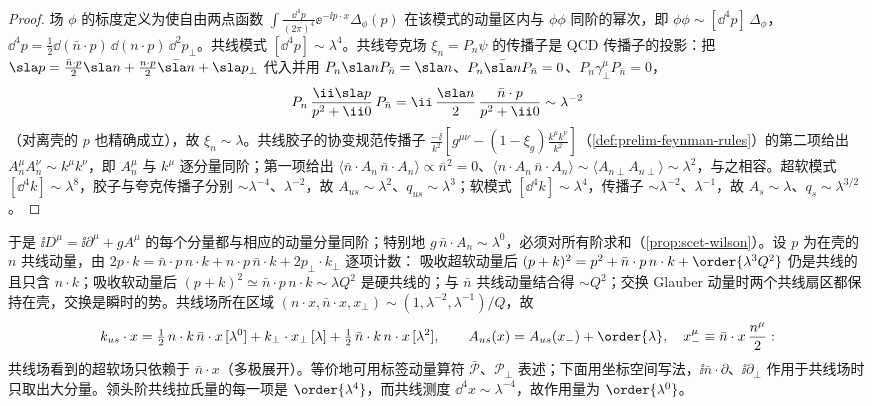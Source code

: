 \begin{proof}
场 $\phi$ 的标度定义为使自由两点函数 $\int\frac{\dd^4p}{(2\pi)^4}\ee^{-\ii p\cdot x}\Delta_\phi(p)$ 在该模式的动量区内与 $\phi\phi$ 同阶的幂次，即 $\phi\phi\sim[\dd^4p]\,\Delta_\phi$，$\dd^4p=\frac12\dd(\bar n\cdot p)\,\dd(n\cdot p)\,\dd^2p_\perp$。共线模式 $[\dd^4p]\sim\lambda^4$。共线夸克场 $\xi_n=P_n\psi$ 的传播子是 QCD 传播子的投影：把 $\sla p=\frac{\bar n\cdot p}{2}\sla n+\frac{n\cdot p}{2}\bar{\sla n}+\sla p_\perp$ 代入并用 $P_n\sla nP_{\bar n}=\sla n$、$P_n\bar{\sla n}P_{\bar n}=0$、$P_n\gamma_\perp^\mu P_{\bar n}=0$，
\begin{equation}\label{eq:scet-xiprop}
P_n\,\frac{\ii\sla p}{p^2+\ii0}\,P_{\bar n}=\ii\,\frac{\sla n}{2}\,\frac{\bar n\cdot p}{p^2+\ii0}\sim\lambda^{-2}
\end{equation}
（对离壳的 $p$ 也精确成立），故 $\xi_n\sim\lambda$。共线胶子的协变规范传播子 $\frac{-\ii}{k^2}[g^{\mu\nu}-(1-\xi_g)\frac{k^\mu k^\nu}{k^2}]$（\cref{def:prelim-feynman-rules}）的第二项给出 $A_n^\mu A_n^\nu\sim k^\mu k^\nu$，即 $A_n^\mu$ 与 $k^\mu$ 逐分量同阶；第一项给出 $\langle\bar n\cdot A_n\,\bar n\cdot A_n\rangle\propto\bar n^2=0$、$\langle n\cdot A_n\,\bar n\cdot A_n\rangle\sim\langle A_{n\perp}A_{n\perp}\rangle\sim\lambda^2$，与之相容。超软模式 $[\dd^4k]\sim\lambda^8$，胶子与夸克传播子分别 $\sim\lambda^{-4}$、$\lambda^{-2}$，故 $A_{us}\sim\lambda^2$、$q_{us}\sim\lambda^3$；软模式 $[\dd^4k]\sim\lambda^4$，传播子 $\sim\lambda^{-2}$、$\lambda^{-1}$，故 $A_s\sim\lambda$、$q_s\sim\lambda^{3/2}$。
\end{proof}

于是 $\ii D^\mu=\ii\partial^\mu+gA^\mu$ 的每个分量都与相应的动量分量同阶；特别地 $g\,\bar n\cdot A_n\sim\lambda^0$，必须对所有阶求和（\cref{prop:scet-wilson}）。设 $p$ 为在壳的 $n$ 共线动量，由 $2p\cdot k=\bar n\cdot p\,n\cdot k+n\cdot p\,\bar n\cdot k+2p_\perp\cdot k_\perp$ 逐项计数：%
吸收超软动量后 $(p+k)^2=p^2+\bar n\cdot p\,n\cdot k+\order{\lambda^3Q^2}$ 仍是共线的且只含 $n\cdot k$；吸收软动量后 $(p+k)^2\simeq\bar n\cdot p\,n\cdot k\sim\lambda Q^2$ 是硬共线的；与 $\bar n$ 共线动量结合得 $\sim Q^2$；交换 Glauber 动量时两个共线扇区都保持在壳，交换是瞬时的势。共线场所在区域 $(n\cdot x,\bar n\cdot x,x_\perp)\sim(1,\lambda^{-2},\lambda^{-1})/Q$，故
\begin{equation}\label{eq:scet-multipole}
k_{us}\cdot x=\tfrac12\,n\cdot k\,\bar n\cdot x\,[\lambda^0]+k_\perp\cdot x_\perp\,[\lambda]+\tfrac12\,\bar n\cdot k\,n\cdot x\,[\lambda^2],\qquad
A_{us}(x)=A_{us}(x_-)+\order{\lambda},\quad x_-^\mu\equiv\bar n\cdot x\,\frac{n^\mu}{2}:
\end{equation}
共线场看到的超软场只依赖于 $\bar n\cdot x$（多极展开）。等价地可用标签动量算符 $\bar{\mathcal P}$、$\mathcal P_\perp$ 表述\cite{BauerEtAl2001,BauerStewart2001}；下面用坐标空间写法\cite{BenekeEtAl2002,Beneke:2002ni}，$\ii\bar n\cdot\partial$、$\ii\partial_\perp$ 作用于共线场时只取出大分量。领头阶共线拉氏量的每一项是 $\order{\lambda^4}$，而共线测度 $\dd^4x\sim\lambda^{-4}$，故作用量为 $\order{\lambda^0}$。

